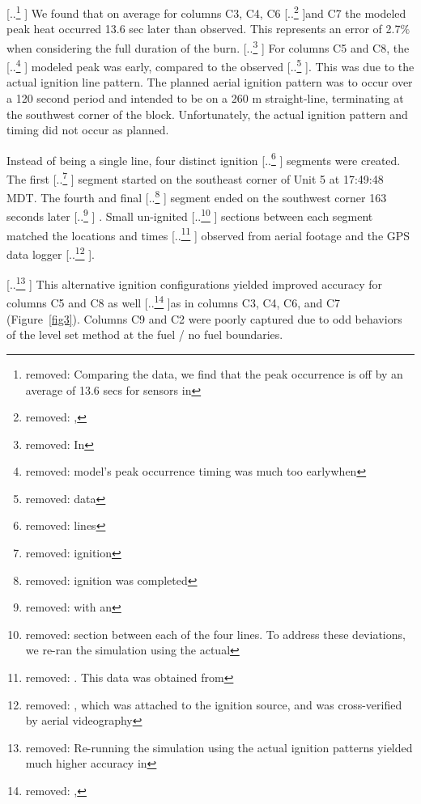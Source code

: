 \documentclass[preprints,article,accept,moreauthors,pdftex]{Definitions/mdpi}
\providecommand{\DIFadd}[1]{{\protect\color{blue} \sf #1}} %
\providecommand{\DIFdel}[1]{{\protect\color{red} [..\footnote{removed: #1} ]}} %
\providecommand{\DIFaddbegin}{} %
\providecommand{\DIFaddend}{} %
\providecommand{\DIFdelbegin}{} %
\providecommand{\DIFdelend}{} %
\begin{document}
\DIFdelbegin \DIFdel{Comparing the data, we find that the peak occurrence is off by an average of 13.6 secs for sensors in }\DIFdelend \DIFaddbegin \DIFadd{We found that on average for }\DIFaddend columns C3, C4, C6 \DIFdelbegin \DIFdel{, }\DIFdelend and C7 \DIFaddbegin \DIFadd{the modeled peak heat occurred 13.6 sec later than observed}\DIFaddend . This represents an error of 2.7$\%$ when considering the full duration of the burn. \DIFdelbegin \DIFdel{In }\DIFdelend \DIFaddbegin \DIFadd{For }\DIFaddend columns C5 and C8, the \DIFdelbegin \DIFdel{model’s peak occurrence timing was much too earlywhen }\DIFdelend \DIFaddbegin \DIFadd{modeled peak was early,  }\DIFaddend compared to the observed\DIFdelbegin \DIFdel{data}\DIFdelend . This was due to the actual ignition line pattern. The planned aerial ignition pattern was to occur over a 120 second period and intended to be on a 260 m straight-line, terminating at the southwest corner of the block. Unfortunately, the actual ignition pattern and timing did not occur as planned.

Instead of being a single line, four distinct ignition \DIFdelbegin \DIFdel{lines }\DIFdelend \DIFaddbegin \DIFadd{segments }\DIFaddend were created. The first \DIFdelbegin \DIFdel{ignition }\DIFdelend \DIFaddbegin \DIFadd{segment }\DIFaddend started on the southeast corner of Unit 5 at 17:49:48 MDT. The fourth and final \DIFdelbegin \DIFdel{ignition was completed }\DIFdelend \DIFaddbegin \DIFadd{segment ended }\DIFaddend on the southwest corner 163 seconds later\DIFdelbegin \DIFdel{with an }\DIFdelend \DIFaddbegin \DIFadd{. Small }\DIFaddend un-ignited \DIFdelbegin \DIFdel{section between each of the four lines. To address these deviations, we re-ran the simulation using the actual }\DIFdelend \DIFaddbegin \DIFadd{sections between each segment matched the }\DIFaddend locations and times \DIFdelbegin \DIFdel{. This data was obtained from }\DIFdelend \DIFaddbegin \DIFadd{observed from aerial footage and }\DIFaddend the GPS data logger\DIFdelbegin \DIFdel{, which was attached to the ignition source, and was cross-verified by aerial videography}\DIFdelend .

\DIFdelbegin \DIFdel{Re-running the simulation using the actual ignition patterns yielded much higher accuracy in }\DIFdelend \DIFaddbegin \DIFadd{This alternative ignition configurations yielded improved accuracy for }\DIFaddend columns C5 and C8 as well \DIFdelbegin \DIFdel{, }\DIFdelend as in columns C3, C4, C6, and C7 (Figure~\ref{fig3}). Columns C9 and C2 were poorly captured due to odd behaviors of the level set method at the fuel / no fuel boundaries.
\end{document}

